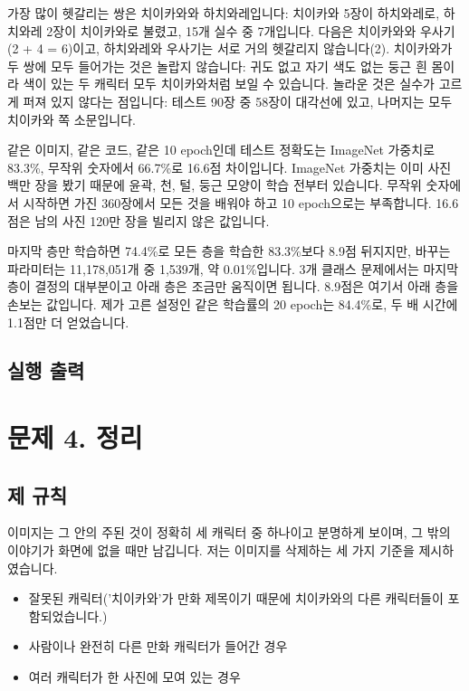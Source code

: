 \documentclass[11pt]{article}
\begin{document}
가장 많이 헷갈리는 쌍은 치이카와와 하치와레입니다: 치이카와 5장이
하치와레로, 하치와레 2장이 치이카와로 불렸고, 15개 실수 중 7개입니다.
다음은 치이카와와 우사기(2 + 4 = 6)이고, 하치와레와 우사기는 서로 거의
헷갈리지 않습니다(2). 치이카와가 두 쌍에 모두 들어가는 것은 놀랍지
않습니다: 귀도 없고 자기 색도 없는 둥근 흰 몸이라 색이 있는 두 캐릭터 모두
치이카와처럼 보일 수 있습니다. 놀라운 것은 실수가 고르게 퍼져 있지 않다는
점입니다: 테스트 90장 중 58장이 대각선에 있고, 나머지는 모두 치이카와 쪽
소문입니다.

같은 이미지, 같은 코드, 같은 10 epoch인데 테스트 정확도는 ImageNet 가중치로
83.3\%, 무작위 숫자에서 66.7\%로 16.6점 차이입니다. ImageNet 가중치는 이미
사진 백만 장을 봤기 때문에 윤곽, 천, 털, 둥근 모양이 학습 전부터 있습니다.
무작위 숫자에서 시작하면 가진 360장에서 모든 것을 배워야 하고 10 epoch으로는
부족합니다. 16.6점은 남의 사진 120만 장을 빌리지 않은 값입니다.

마지막 층만 학습하면 74.4\%로 모든 층을 학습한 83.3\%보다 8.9점 뒤지지만,
바꾸는 파라미터는 11,178,051개 중 1,539개, 약 0.01\%입니다. 3개 클래스
문제에서는 마지막 층이 결정의 대부분이고 아래 층은 조금만 움직이면 됩니다.
8.9점은 여기서 아래 층을 손보는 값입니다. 제가 고른 설정인 같은 학습률의
20 epoch는 84.4\%로, 두 배 시간에 1.1점만 더 얻었습니다.

\subsection*{실행 출력}

\section*{문제 4. 정리}

\subsection*{제 규칙}
이미지는 그 안의 주된 것이 정확히 세 캐릭터 중 하나이고 분명하게 보이며,
그 밖의 이야기가 화면에 없을 때만 남깁니다. 저는 이미지를 삭제하는 세 가지
기준을 제시하였습니다.
\begin{itemize}
  \item 잘못된 캐릭터('치이카와'가 만화 제목이기 때문에 치이카와의 다른
        캐릭터들이 포함되었습니다.)
  \item 사람이나 완전히 다른 만화 캐릭터가 들어간 경우
  \item 여러 캐릭터가 한 사진에 모여 있는 경우
\end{itemize}
\end{document}
